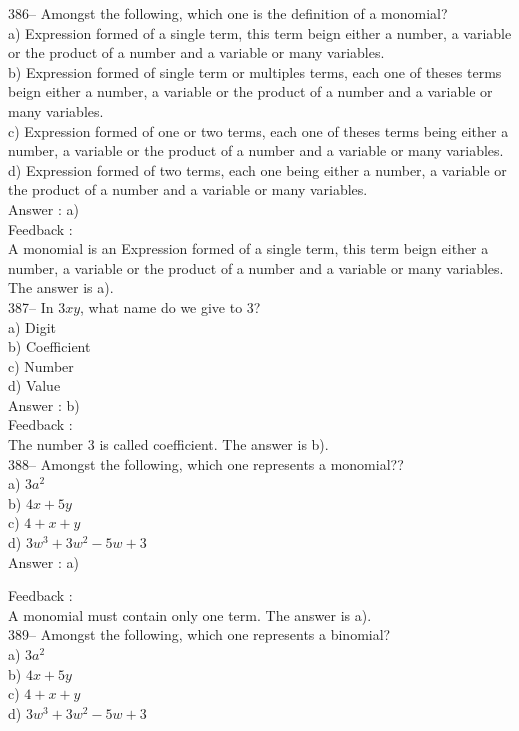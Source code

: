 ﻿\documentclass[letterpaper, 12pt]{article}
\begin{document}
386-- Amongst the following, which one is the definition of a monomial?\\
a) Expression formed of a single term, this term beign either a number, a variable or the product of a number and a variable or many variables.\\
b) Expression formed of single term or multiples terms, each one of theses terms beign either a number, a variable or the product of a number and a variable or many variables.\\
c) Expression formed of one or two terms, each one of theses terms being either a number, a variable or the product of a number and a variable or many variables.\\
d) Expression formed of two terms, each one being either a number, a variable or the product of a number and a variable or many variables.\\

Answer : a)\\

Feedback : \\
A monomial is an Expression formed of a single term, this term beign either a number, a variable or the product of a number and a variable or many variables.  The answer is a).\\

387--  In $3xy$, what name do we give to 3?\\
a) Digit\\
b) Coefficient\\
c) Number\\
d) Value\\

Answer : b)\\

Feedback : \\
The number 3 is called coefficient.  The answer is b).\\

388-- Amongst the following, which one represents a monomial??\\
a) $3a^{2}$\\
b) $4x+5y$\\
c) $4+x+y$\\
d) $3w^{3}+3w^{2}-5w+3$\\

Answer : a)

Feedback : \\
A monomial must contain only one term. The answer is a).\\

389-- Amongst the following, which one represents a binomial?\\
a) $3a^{2}$\\
b) $4x+5y$\\
c) $4+x+y$\\
d) $3w^{3}+3w^{2}-5w+3$\\
\end{document}
